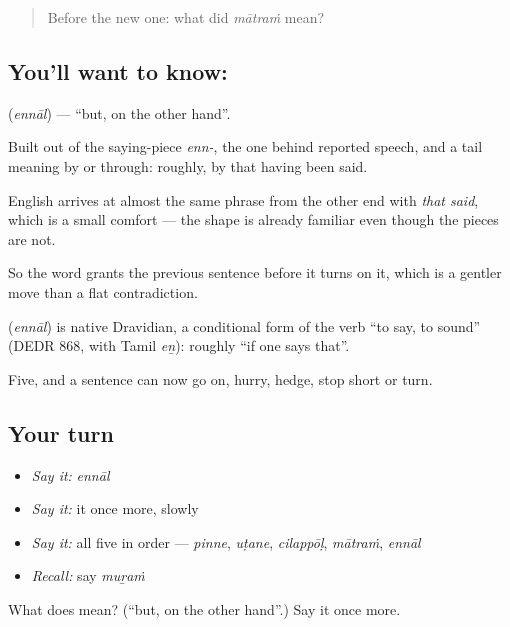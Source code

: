 \label{lesson:ML-C64-but}



\begin{quote}
Before the new one: what did \emph{mātraṁ} mean?
\end{quote}

\subsection*{You'll want to know: }
\textbf{} (\emph{ennāl}) — \textquotedblleft{}but, on the other hand\textquotedblright{}.

Built out of the saying-piece \emph{enn-}, the one behind reported speech, and a tail meaning by or through: roughly, by that having been said.

English arrives at almost the same phrase from the other end with \emph{that said}, which is a small comfort — the shape is already familiar even though the pieces are not.

So the word grants the previous sentence before it turns on it, which is a gentler move than a flat contradiction.

\begin{cousinweb}
\textbf{} (\emph{ennāl}) is native Dravidian, a conditional form of the verb \textquotedblleft{}to say, to sound\textquotedblright{} (DEDR 868, with Tamil \emph{eṉ}): roughly \textquotedblleft{}if one says that\textquotedblright{}.
\end{cousinweb}

\begin{grammarlens}[title={What you've built}]
Five, and a sentence can now go on, hurry, hedge, stop short or turn.
\end{grammarlens}

\subsection*{Your turn}
\begin{itemize}
\raggedright
  \item \emph{Say it:} \emph{ennāl}
  \item \emph{Say it:} it once more, slowly
  \item \emph{Say it:} all five in order — \emph{pinne}, \emph{uṭane}, \emph{cilappōḷ}, \emph{mātraṁ}, \emph{ennāl}
  \item \emph{Recall:} say \emph{muṟaṁ}
\end{itemize}

\begin{tcolorbox}[breakable,colback=teal!4,colframe=teal!35!black,title={Before you move on}]
What does  mean? (\textquotedblleft{}but, on the other hand\textquotedblright{}.) Say it once more.
\end{tcolorbox}
